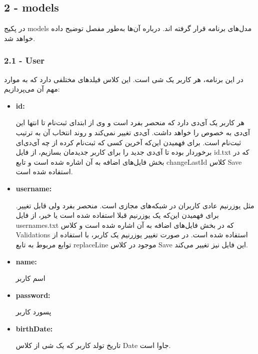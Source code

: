 \documentclass[12pt]{article}
\begin{document}
\LTR
\begin{latin}
\subsection*{2 - models}
\end{latin}
\RTL
در پکیج models مدل‌های برنامه قرار گرفته اند. درباره آن‌ها به‌طور مفصل توضیح داده خواهد شد.

\LTR
\begin{latin}
\subsubsection*{2.1 - User}
\end{latin}
\RTL
در این برنامه، هر کاربر یک شی است. این کلاس فیلدهای مختلفی دارد که به موارد مهم آن می‌پردازیم:
\begin{itemize}

\item
\begin{latin}
\textbf{id:}
\end{latin}
 هر کاربر یک آی‌دی دارد که منحصر بفرد است و وی از ابتدای ثبت‌نام تا انتها این آی‌دی به خصوص را خواهد داشت. آی‌دی تغییر نمی‌کند و روند انتخاب آن به ترتیب ثبت‌نام است. برای فهمیدن این‌که آخرین کسی که ثبت‌نام کرده از چه آی‌دی‌ای برخوردار بوده تا آی‌دی جدید را برای کاربر جدیدمان بسازیم، از فایل id.txt که در بخش فایل‌های اضافه به آن اشاره شده است و تابع changeLastId کلاس Save استفاده شده است.
 
\item
\begin{latin}
\textbf{username:}
\end{latin}
مثل یوزرنیم عادی کاربران در شبکه‌های مجازی است. منحصر بفرد ولی قابل تغییر. برای فهمیدن این‌که یک یوزرنیم قبلا استفاده شده است یا خیر، از فایل usernames.txt که در بخش فایل‌های اضافه به آن اشاره شده است و کلاس Validations استفاده شده است.
در صورت تغییر یوزرنیم یک کاربر، با استفاده از توابع مربوط به تابع replaceLine موجود در کلاس Save این فایل نیز تغییر می‌کند.

\item
\begin{latin}
\textbf{name:}
\end{latin}
اسم کاربر

\item
\begin{latin}
\textbf{password:}
\end{latin}
پسورد کاربر

\item
\begin{latin}
\textbf{birthDate:}
\end{latin}
تاریخ تولد کاربر که یک شی از کلاس Date جاوا است.


\end{itemize}
\end{document}
